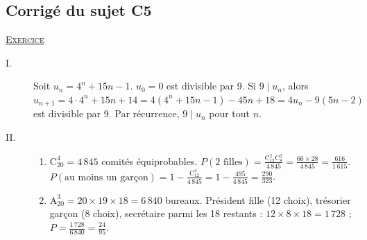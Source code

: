 \begin{corrige}
\subsection{Corrig\'e du sujet C5}
\noindent \underline{\textsc{Exercice}}
\begin{description}
\item[I.] Soit $u_n = 4^n + 15n - 1$. $u_0 = 0$ est divisible par 9. Si $9 \mid u_n$, alors
      $u_{n+1} = 4 \cdot 4^n + 15n + 14 = 4(4^n + 15n - 1) - 45n + 18 = 4u_n - 9(5n - 2)$ est divisible par 9.
      Par r\'ecurrence, $9 \mid u_n$ pour tout $n$.
\item[II.] \begin{enumerate}
      \item $\mathrm{C}_{20}^4 = 4\,845$ comit\'es \'equiprobables. $P(\text{2 filles}) = \frac{\mathrm{C}_{12}^2\mathrm{C}_8^2}{4\,845} = \frac{66 \times 28}{4\,845} = \frac{616}{1\,615}$.
            $P(\text{au moins un gar\c{c}on}) = 1 - \frac{\mathrm{C}_{12}^4}{4\,845} = 1 - \frac{495}{4\,845} = \frac{290}{323}$.
      \item $\mathrm{A}_{20}^3 = 20 \times 19 \times 18 = 6\,840$ bureaux. Pr\'esident fille (12 choix), tr\'esorier gar\c{c}on (8 choix),
            secr\'etaire parmi les 18 restants : $12 \times 8 \times 18 = 1\,728$ ; $P = \frac{1\,728}{6\,840} = \frac{24}{95}$.
      \end{enumerate}
\end{description}


\end{corrige}
